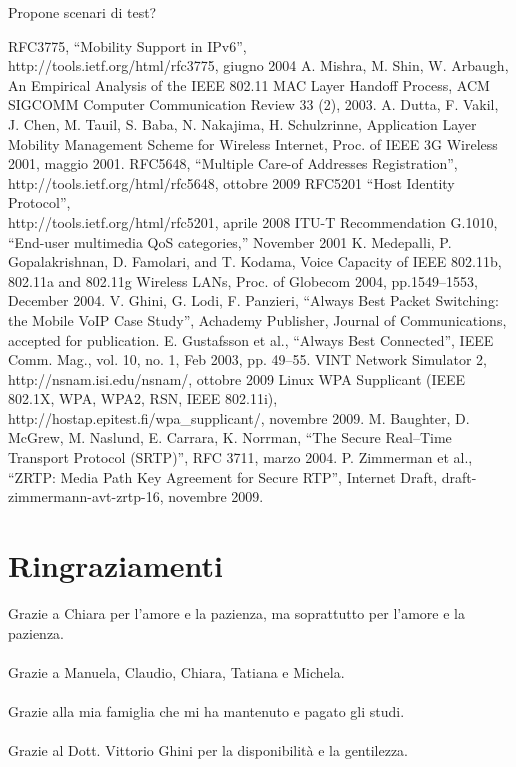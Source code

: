 \documentclass[12pt,a4paper,openright,twoside]{book}
\begin{document}
Propone scenari di test?

\clearpage{\pagestyle{empty}\cleardoublepage}


\begin{thebibliography}{90}
\rhead[\fancyplain{}{\bfseries \leftmark}]{\fancyplain{}{\bfseries
\thepage}}
 RFC3775, ``Mobility Support in IPv6'',\\
  http://tools.ietf.org/html/rfc3775, giugno 2004
 A. Mishra, M. Shin, W. Arbaugh, An
  Empirical Analysis of the IEEE 802.11 MAC Layer Handoff Process, ACM
  SIGCOMM Computer Communication Review 33 (2), 2003.
 A. Dutta, F. Vakil, J. Chen,
  M. Tauil, S. Baba, N. Nakajima, H.  Schulzrinne, Application Layer
  Mobility Management Scheme for Wireless Internet, Proc. of IEEE 3G
  Wireless 2001, maggio 2001.
 RFC5648, ``Multiple Care-of Addresses
  Registration'',\\http://tools.ietf.org/html/rfc5648, ottobre 2009
 RFC5201 ``Host Identity Protocol'',\\
  http://tools.ietf.org/html/rfc5201, aprile 2008
 ITU-T Recommendation G.1010, “End-user multimedia
  QoS categories,” November 2001
 K. Medepalli, P. Gopalakrishnan, D. Famolari,
  and T. Kodama, Voice Capacity of IEEE 802.11b, 802.11a and 802.11g
  Wireless LANs, Proc. of Globecom 2004, pp.1549–1553, December 2004.
 V. Ghini, G. Lodi, F. Panzieri, ``Always Best
  Packet Switching: the Mobile VoIP Case Study'', Achademy Publisher,
  Journal of Communications, accepted for publication.
 E. Gustafsson et al., ``Always Best Connected'',
  IEEE Comm. Mag., vol. 10, no. 1, Feb 2003, pp. 49--55.
 VINT Network Simulator 2,
  http://nsnam.isi.edu/nsnam/, ottobre 2009
 Linux WPA Supplicant (IEEE 802.1X, WPA,
  WPA2, RSN, IEEE 802.11i), http://hostap.epitest.fi/wpa\_supplicant/,
  novembre 2009.
 M. Baughter, D. McGrew, M. Naslund, E. Carrara,
  K. Norrman, ``The Secure Real--Time Transport Protocol (SRTP)'', RFC
  3711, marzo 2004.
 P. Zimmerman et al., ``ZRTP: Media Path Key
  Agreement for Secure RTP'', Internet Draft,
  draft-zimmermann-avt-zrtp-16, novembre 2009.
\end{thebibliography}

\clearpage{\pagestyle{empty}\cleardoublepage}

\chapter*{Ringraziamenti}
\thispagestyle{empty}

\noindent Grazie a Chiara per l'amore e la pazienza, ma soprattutto
per l'amore e la pazienza.\\\\Grazie a Manuela, Claudio, Chiara,
Tatiana e Michela.\\\\Grazie alla mia famiglia che mi ha mantenuto e
pagato gli studi.\\\\Grazie al Dott. Vittorio Ghini per la
disponibilità e la gentilezza.
\end{document}
